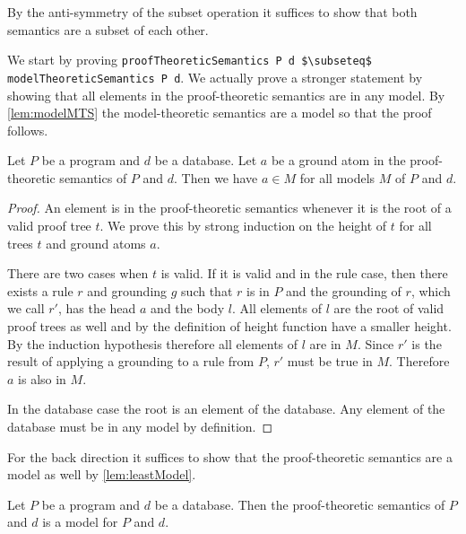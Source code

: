 By the anti-symmetry of the subset operation it suffices to show that both semantics are a subset of each other.

We start by proving \lstinline|proofTheoreticSemantics P d $\subseteq$ modelTheoreticSemantics P d|. We actually prove a stronger statement by showing that all elements in the proof-theoretic semantics are in any model. By \cref{lem:modelMTS} the model-theoretic semantics are a model so that the proof follows.

\begin{lemma}[\proofTreeAtomsInEveryModel]
    Let $P$ be a program and $d$ be a database. Let $a$ be a ground atom in the proof-theoretic semantics of $P$ and $d$. Then we have $a \in M$ for all models $M$ of $P$ and $d$.
\end{lemma}
\begin{proof}
    An element is in the proof-theoretic semantics whenever it is the root of a valid proof tree $t$. We prove this by strong induction on the height of $t$ for all trees $t$ and ground atoms $a$.

    There are two cases when $t$ is valid. If it is valid and in the rule case, then there exists a rule $r$ and grounding $g$ such that $r$ is in $P$ and the grounding of $r$, which we call $r'$, has the head $a$ and the body $l$. All elements of $l$ are the root of valid proof trees as well and by the definition of height function have a smaller height. By the induction hypothesis therefore all elements of $l$ are in $M$. Since $r'$ is the result of applying a grounding to a rule from $P$, $r'$ must be true in $M$. Therefore $a$ is also in $M$.

    In the database case the root is an element of the database. Any element of the database must be in any model by definition. 
\end{proof}

For the back direction it suffices to show that the proof-theoretic semantics are a model as well by \cref{lem:leastModel}.

\begin{lemma}[\proofTheoreticSemanticsIsModel]\label{lem:PTSModel}
    Let $P$ be a program and $d$ be a database. Then the proof-theoretic semantics of $P$ and $d$ is a model for $P$ and $d$.
\end{lemma}

